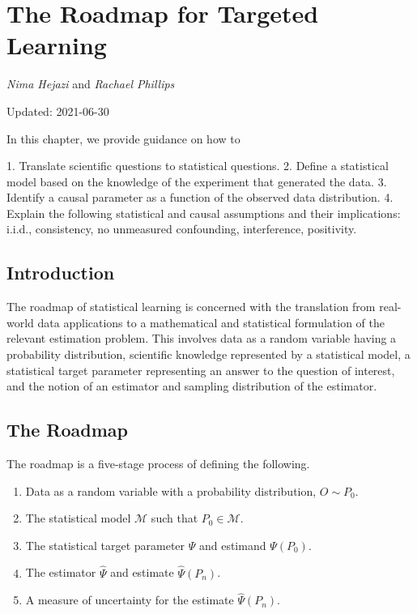 \documentclass[12pt, krantz2,]{krantz}
\providecommand{\tightlist}{%
  \setlength{\itemsep}{0pt}\setlength{\parskip}{0pt}}
\theoremstyle{definition}
\theoremstyle{definition}
\theoremstyle{definition}
\newcommand{\M}{\mathcal{M}}
\newcommand{\1}{\mathbbm{1}}
\begin{document}
\hypertarget{intro}{%
\chapter{The Roadmap for Targeted Learning}\label{intro}}

\emph{Nima Hejazi} and \emph{Rachael Phillips}

Updated: 2021-06-30

\begin{VT1}



In this chapter, we provide guidance on how to

1. Translate scientific questions to statistical questions.
2. Define a statistical model based on the knowledge of the experiment that
   generated the data.
3. Identify a causal parameter as a function of the observed data distribution.
4. Explain the following statistical and causal assumptions and their
   implications: i.i.d., consistency, no unmeasured confounding, interference,
   positivity.

\end{VT1}

\hypertarget{introduction}{%
\section*{Introduction}\label{introduction}}


The roadmap of statistical learning is concerned with the translation from
real-world data applications to a mathematical and statistical formulation of
the relevant estimation problem. This involves data as a random variable having
a probability distribution, scientific knowledge represented by a statistical
model, a statistical target parameter representing an answer to the question of
interest, and the notion of an estimator and sampling distribution of the
estimator.

\hypertarget{roadmap}{%
\section{The Roadmap}\label{roadmap}}

The roadmap is a five-stage process of defining the following.

\begin{enumerate}
\def\labelenumi{\arabic{enumi}.}
\tightlist
\item
  Data as a random variable with a probability distribution, \(O \sim P_0\).
\item
  The statistical model \(\M\) such that \(P_0 \in \M\).
\item
  The statistical target parameter \(\Psi\) and estimand \(\Psi(P_0)\).
\item
  The estimator \(\hat{\Psi}\) and estimate \(\hat{\Psi}(P_n)\).
\item
  A measure of uncertainty for the estimate \(\hat{\Psi}(P_n)\).
\end{enumerate}
\end{document}
